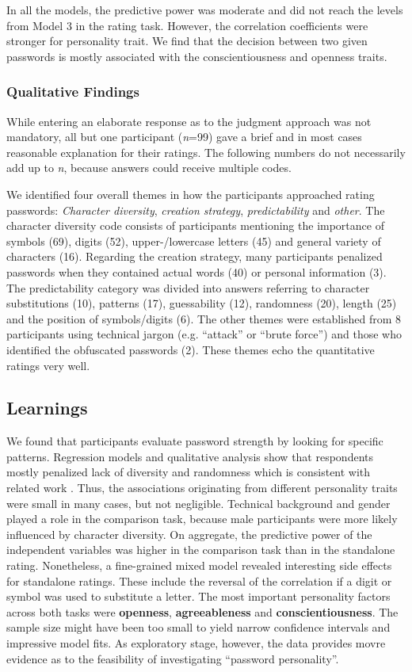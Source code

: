 In all the models, the predictive power was moderate and did not reach the levels from Model 3 in the rating task. However, the correlation coefficients were stronger for personality trait. We find that the decision between two given passwords is mostly associated with the conscientiousness and openness traits.

%

\subsubsection{Qualitative Findings}
While entering an elaborate response as to the judgment approach was not mandatory, all but one participant (\textit{n}=99) gave a brief and in most cases reasonable explanation for their ratings. The following numbers do not necessarily add up to \textit{n}, because answers could receive multiple codes.

We identified four overall themes in how the participants approached rating passwords: \textit{Character diversity}, \textit{creation strategy}, \textit{predictability} and \textit{other}. The character diversity code consists of participants mentioning the importance of symbols (69), digits (52), upper-/lowercase letters (45) and general variety of characters (16). Regarding the creation strategy, many participants penalized passwords when they contained actual words (40) or personal information (3). The predictability category was divided into answers referring to character substitutions (10), patterns (17), guessability (12), randomness (20), length (25) and the position of symbols/digits (6). The other themes were established from 8 participants using technical jargon (e.g. ``attack'' or ``brute force'') and those who identified the obfuscated passwords (2). These themes echo the quantitative ratings very well. 

\subsection{Learnings}
We found that participants evaluate password strength by looking for specific patterns. Regression models and qualitative analysis show that respondents mostly penalized lack of diversity and randomness which is consistent with related work \cite{Ur2016PerceptionsPassword}. Thus, the associations originating from different personality traits were small in many cases, but not negligible. Technical background and gender played a role in the comparison task, because male participants were more likely influenced by character diversity. On aggregate, the predictive power of the independent variables was higher in the comparison task than in the standalone rating. Nonetheless, a fine-grained mixed model revealed interesting side effects for standalone ratings. These include the reversal of the correlation if a digit or symbol was used to substitute a letter. The most important personality factors across both tasks were \textbf{openness}, \textbf{agreeableness} and \textbf{conscientiousness}. The sample size might have been too small to yield narrow confidence intervals and impressive model fits. As exploratory stage, however, the data provides movre evidence as to the feasibility of investigating ``password personality''. 